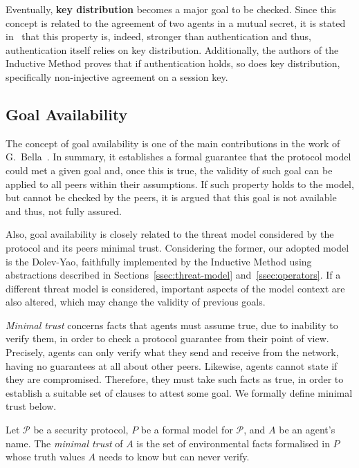 Eventually, \textbf{key distribution} becomes a major goal to be checked. Since this concept is related to the agreement of two agents in a mutual secret, it is stated in~\cite{BellareRogaway93} that this property is, indeed, stronger than authentication and thus, authentication itself relies on key distribution. Additionally, the authors of the Inductive Method proves that if authentication holds, so does key distribution, specifically non-injective agreement on a session key.



\subsection{Goal Availability}
The concept of goal availability is one of the main contributions in the work of G.~Bella~\cite{Bella2007}. In summary, it establishes a formal guarantee that the protocol model could met a given goal and, once this is true, the validity of such goal can be applied to all peers within their assumptions. If such property holds to the model, but cannot be checked by the peers, it is argued that this goal is not available and thus, not fully assured.

Also, goal availability is closely related to the threat model considered by the protocol and its peers minimal trust. Considering the former, our adopted model is the Dolev-Yao, faithfully implemented by the Inductive Method using abstractions described in Sections~\ref{ssec:threat-model} and~\ref{ssec:operators}. If a different threat model is considered, important aspects of the model context are also altered, which may change the validity of previous goals.

\textit{Minimal trust} concerns facts that agents must assume true, due to inability to verify them, in order to check a protocol guarantee from their point of view. Precisely, agents can only verify what they send and receive from the network, having no guarantees at all about other peers. Likewise, agents cannot state if they are compromised. Therefore, they must take such facts as true, in order to establish a suitable set of clauses to attest some goal. We formally define minimal trust below.

\begin{definition}
  Let \(\mathcal{P}\) be a security protocol, \(P\) be a formal model for \(\mathcal{P}\), and \(A\) be an agent's name. The \textit{minimal trust} of \(A\) is the set of environmental facts formalised in \(P\) whose truth values \(A\) needs to know but can never verify.
\end{definition}

